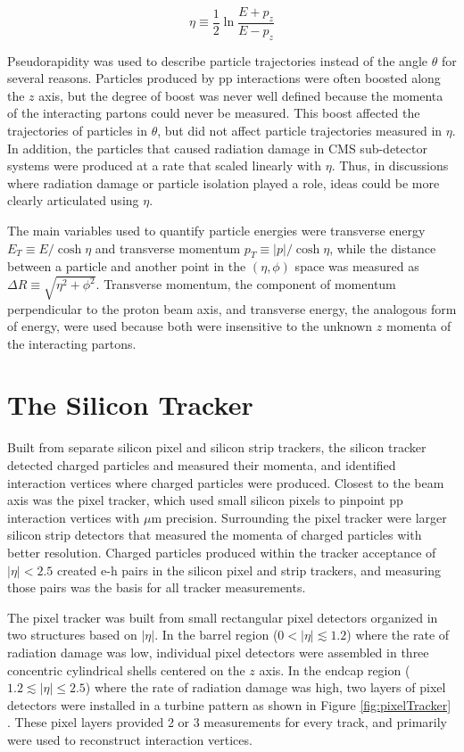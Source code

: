 \begin{equation}
	\eta \equiv \frac{1}{2}\ln{\frac{E+p_{z}}{E-p_{z}}}
\end{equation}

Pseudorapidity was used to describe particle trajectories instead of the angle $\theta$ for several reasons.  Particles 
produced by pp interactions were often boosted along the $z$ axis, but the degree of boost was never well 
defined because the momenta of the interacting partons could never be measured.  This boost affected the 
trajectories of particles in $\theta$, but did not affect particle trajectories measured in $\eta$.  In 
addition, the particles that caused radiation damage in CMS sub-detector systems were produced at 
a rate that scaled linearly with $\eta$.  Thus, in discussions where radiation damage or particle 
isolation played a role, ideas could be more clearly articulated using $\eta$.

The main variables used to quantify particle energies were transverse energy 
$E_{T} \equiv E/\cosh{\eta}$ and transverse momentum $p_{T} \equiv |p|/\cosh{\eta}$, while the distance between 
a particle and another point in the $(\eta, \phi)$ space was measured as $\Delta R \equiv \sqrt{\eta^{2} + \phi^{2}}$.  
Transverse momentum, the component of momentum perpendicular to the proton beam axis, and transverse energy, the 
analogous form of energy, were used because both were insensitive to the unknown $z$ momenta of the interacting partons.  

\section{The Silicon Tracker}
\label{sec:siTrackerDescription}
Built from separate silicon pixel and silicon strip trackers, the silicon tracker detected charged particles  
and measured their momenta, and identified interaction vertices where charged particles were produced.  Closest 
to the beam axis was the pixel tracker, which used small silicon pixels to pinpoint pp interaction vertices 
with $\mu$m precision.  Surrounding the pixel tracker were larger silicon strip detectors that measured the 
momenta of charged particles with better resolution.  Charged particles produced within the tracker acceptance of $|\eta| < 2.5$ created 
e-h pairs in the silicon pixel and strip trackers, and measuring those pairs was the basis for all tracker 
measurements.

The pixel tracker was built from small rectangular pixel detectors organized in two 
structures based on $|\eta|$.  In the barrel region ($0 < |\eta| \lesssim 1.2$) where the rate of radiation damage was 
low, individual pixel detectors were assembled in three concentric cylindrical shells centered on the $z$ axis.  In 
the endcap region ($1.2 \lesssim |\eta| \leq 2.5$) where the rate of radiation damage was high, two layers of pixel detectors were 
installed in a turbine pattern as shown in Figure \ref{fig:pixelTracker} \cite{pixelCommissioning}.  These pixel 
layers provided 2 or 3 measurements for every track, and primarily were used to reconstruct interaction 
vertices.

